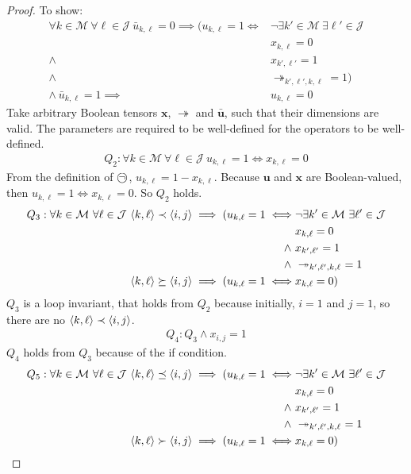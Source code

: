\begin{proof}
	To show:
	\begin{align*}
		\forall k\in\mathcal{M}\ \forall\ell\in\mathcal{J}\ \bar{u}_{k,\ell}=0\implies\Big(u_{k,\ell}=1\iff&\neg\exists k'\in\mathcal{M}\ \exists\ell'\in\mathcal{J}\\
		&x_{k,\ell}=0\\
		\land\ &x_{k',\ell'}=1\\
		\land\ &\twoheadrightarrow_{k',\ell',k,\ell}=1\Big)\\
		\land\ \bar{u}_{k,\ell}=1\implies&u_{k,\ell}=0
	\end{align*}
	Take arbitrary Boolean tensors $\mathbf{x}$, $\twoheadrightarrow$ and $\bar{\mathbf{u}}$, such that their dimensions are valid. The parameters are required to be well-defined for the operators to be well-defined.
	\begin{align*}
		Q_2: \forall k\in\mathcal{M}\ \forall\ell\in\mathcal{J}\ u_{k,\ell}=1\iff x_{k,\ell}=0
	\end{align*}
	From the definition of $\incircbin{\neg}$, $u_{k,\ell}=1-x_{k,\ell}$. Because $\mathbf{u}$ and $\mathbf{x}$ are Boolean-valued, then $u_{k,\ell}=1\iff x_{k,\ell}=0$. So $Q_2$ holds.
	\begin{align*}
		Q_3: \forall k\in\mathcal{M}\ \forall\ell\in\mathcal{J}\ \pair{k}{\ell}\prec\pair{i}{j}\implies(u_{k,\ell}=1\iff&\neg\exists k'\in\mathcal{M}\ \exists\ell'\in\mathcal{J}\\
		&x_{k,\ell}=0\\
		\land\ &x_{k',\ell'}=1\\
		\land\ &\twoheadrightarrow_{k',\ell',k,\ell}\ =1\\
		\pair{k}{\ell}\succeq\pair{i}{j}\implies(u_{k,\ell}=1\iff&x_{k,\ell}=0)
	\end{align*}	
	$Q_3$ is a loop invariant, that holds from $Q_2$ because initially, $i=1$ and $j=1$, so there are no $\langle{k},{\ell}\rangle\prec\langle{i},{j}\rangle$.
	\begin{align*}
		Q_4: Q_3\land x_{i,j}=1
	\end{align*}
	$Q_4$ holds from $Q_3$ because of the if condition.
	\begin{align*}
		Q_5: \forall k\in\mathcal{M}\ \forall\ell\in\mathcal{J}\ \pair{k}{\ell}\preceq\pair{i}{j}\implies(u_{k,\ell}=1\iff&\neg\exists k'\in\mathcal{M}\ \exists\ell'\in\mathcal{J}\\
		&x_{k,\ell}=0\\
		\land\ &x_{k',\ell'}=1\\
		\land\ &\twoheadrightarrow_{k',\ell',k,\ell}\ =1\\
		\pair{k}{\ell}\succ\pair{i}{j}\implies(u_{k,\ell}=1\iff&x_{k,\ell}=0)
	\end{align*}


\end{proof}
